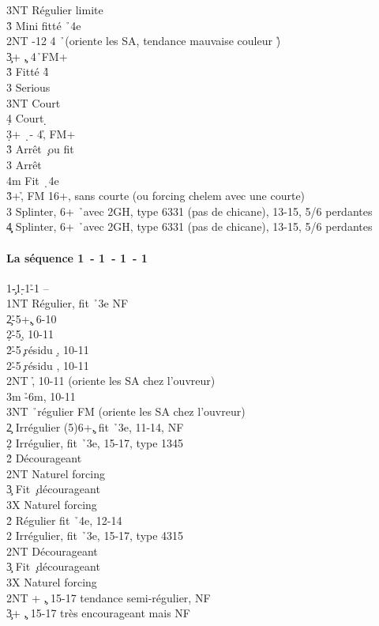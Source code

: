 \documentclass[a4paper]{article}
\begin{document}
\begin{bidtable}
3NT \> Régulier limite\-\\
3\h \> Mini fitté \h\ 4e\-\\
2NT -12 4 \h\ (oriente les SA, tendance mauvaise couleur \h )\\
3\c {}+ \c , 4\h\ FM+\+\\
3\h \> Fitté 4\h \+\\
3\s \> Serious\\
3NT \> Court \s \\
4\d \> Court \d \-\-\\
3\d {}+ \d\ - 4\h , FM+\+\\
3\h \> Arrêt \c\ ou fit \h \\
3\s \> Arrêt \s \\
4m \> Fit \d\ 4e\-\\
3\h {}+\h , FM 16+, sans courte (ou forcing chelem avec une courte)\\
3\s \> Splinter, 6+ \h\ avec 2GH, type 6331 (pas de chicane), 13-15, 5/6 perdantes\\
4\c\d \> Splinter, 6+ \h\ avec 2GH, type 6331 (pas de chicane), 13-15, 5/6 perdantes\-\-
\end{bidtable}

\paragraph{La séquence 1\pdfc\ - 1\pdfd\ - 1\pdfh\ - 1\pdfs}

\begin{bidtable}
1\c-1\d-1\h-1\s \> --\+\\
1NT \> Régulier, fit \h\ 3e NF\+\\
2\c {}\h -5+\c , 6-10\\
2\d {}\h -5\d , 10-11\\
2\h {}\h -5\c\ résidu \d , 10-11\\
2\s {}\h -5\c\ résidu \s , 10-11\\
2NT \h , 10-11 (oriente les SA chez l'ouvreur)\\
3m \h -6m, 10-11\\
3NT \h\ régulier FM (oriente les SA chez l'ouvreur)\-\\
2\c \> Irrégulier (5)6+\c , fit \h\ 3e, 11-14, NF\\
2\d \> Irrégulier, fit \h\ 3e, 15-17, type 1345\+\\
2\h\s \> Décourageant\\
2NT \> Naturel forcing\\
3\c \> Fit \c\ décourageant\\
3X \> Naturel forcing\-\\
2\h \> Régulier fit \h\ 4e, 12-14\\
2\s \> Irrégulier, fit \h\ 3e, 15-17, type 4315\+\\
2NT \> Décourageant\\
3\c \> Fit \c\ décourageant\\
3X \> Naturel forcing\-\\
2NT + \c , 15-17 tendance semi-régulier, NF\\
3\c {}+ \c , 15-17 très encourageant mais NF\-
\end{bidtable}
\end{document}
